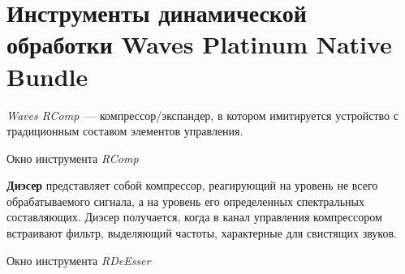 \documentclass{beamer}
\begin{document}
\section[Waves Platinum Native Bundle]{Инструменты динамической обработки Waves Platinum Native Bundle}
\begin{frame}
  \emph{Waves RComp}~--- компрессор/экспандер, в котором имитируется устройство с традиционным составом элементов управления.
  
  \begin{block}{Окно инструмента \emph{RComp}}
  \end{block}
\end{frame}

\begin{frame}
\textbf{Диэсер} представляет собой компрессор, реагирующий на уровень не всего обрабатываемого сигнала, а на уровень его определенных спектральных составляющих. Диэсер получается, когда в канал управления компрессором встраивают фильтр, выделяющий частоты, характерные для свистящих звуков. 

  \begin{block}{Окно инструмента \emph{RDeEsser}}
  \end{block}
\end{frame}
\end{document}
